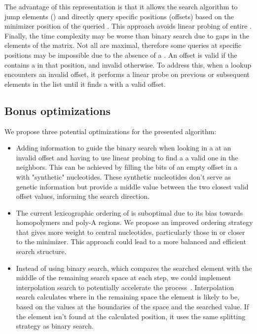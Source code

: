 The advantage of this \skmer representation is that it allows the search algorithm to jump elements (\skmers) and directly query specific positions (offsets) based on the minimizer position of the queried \kmer. This approach avoids linear probing of entire \skmers.\\
Finally, the time complexity may be worse than binary search due to gaps in the elements of the matrix. Not all \skmers are maximal, therefore some queries at specific positions may be impossible due to the absence of a \kmer. An offset is valid if the \skmer contains a \kmer in that position, and invalid otherwise. To address this, when a lookup encounters an invalid offset, it performs a linear probe on previous or subsequent elements in the list until it finds a \skmer with a valid offset.

\subsection*{Bonus optimizations}
We propose three potential optimizations for the presented algorithm:
\begin{itemize}
	\item Adding information to guide the binary search when looking in a \skmer at an invalid offset and having to use linear probing to find a a valid one in the neighbors. This can be achieved by filling the bits of an empty offset in a \skmer with "synthetic" nucleotides. These synthetic nucleotides don't serve as genetic information but provide a middle value between the two closest valid offset values, informing the search direction.
	\item The current lexicographic ordering of \skmers is suboptimal due to its bias towards homopolymers and poly-A regions. We propose an improved ordering strategy that gives more weight to central nucleotides, particularly those in or closer to the minimizer. This approach could lead to a more balanced and efficient search structure.
	\item Instead of using binary search, which compares the searched element with the middle of the remaining search space at each step, we could implement interpolation search to potentially accelerate the process~\cite{pla_complexity}. Interpolation search calculates where in the remaining space the element is likely to be, based on the values at the boundaries of the space and the searched value. If the element isn't found at the calculated position, it uses the same splitting strategy as binary search.
\end{itemize}